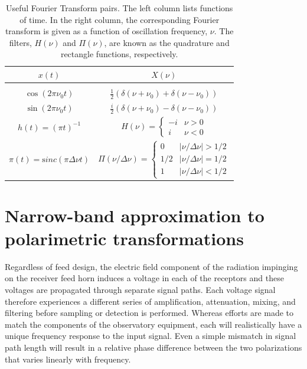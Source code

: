 \documentclass[twocolumn]{aastex6}
\newcommand{\Ci}{\ensuremath{i}}
\newcommand{\sinc}{\mathrm sinc}
\newcommand{\bw}{\ensuremath{ \Delta\nu }}
\begin{document}
\begin{appendix}
\begin{table}
\begin{center}
\begin{tabular}{c|c}
\hline
\hline
$x(t)$ & $X(\nu)$ \\
\hline \\ [-2mm]
$\cos(2\pi\nu_0t)$ & $\frac{1}{2}(\delta(\nu+\nu_0)+\delta(\nu-\nu_0))$ \\ [4mm]
$\sin(2\pi\nu_0t)$ & $\frac{\Ci}{2}(\delta(\nu+\nu_0)-\delta(\nu-\nu_0))$ \\ [4mm]
$h(t)=(\pi t)^{-1}$ & $H(\nu) =\left\{ \begin{array}{cc}
	       	        	-\Ci & \nu > 0 \\
	                	\Ci  & \nu < 0 \end{array} \right.$ \\ [4mm]
$\pi(t)=\sinc(\pi\bw t)$ & $\Pi(\nu/\bw) = \left\{ \begin{array}{cc}
                		0  & |\nu/\bw| > 1/2 \\
				1/2& |\nu/\bw| = 1/2 \\
               			1  & |\nu/\bw| < 1/2 \end{array} \right.$ \\ [8mm]
\hline
\end{tabular}
\end{center}
\caption
{Useful Fourier Transform pairs. The left column lists functions of
time.  In the right column, the corresponding Fourier transform is
given as a function of oscillation frequency, $\nu$. The filters,
$H(\nu)$ and $\Pi(\nu)$, are known as the quadrature and rectangle
functions, respectively.}
\label{tab:fourier}
\end{table}


\section{Narrow-band approximation to polarimetric transformations}
\label{app:linear_transformations}

Regardless of feed design, the electric field component of the
radiation impinging on the receiver feed horn induces a voltage in
each of the receptors and these voltages are propagated through
separate signal paths.
%
Each voltage signal therefore experiences a different series of
amplification, attenuation, mixing, and filtering before sampling or
detection is performed.  Whereas efforts are made to match the
components of the observatory equipment, each will realistically have
a unique frequency response to the input signal.  Even a simple
mismatch in signal path length will result in a relative phase
difference between the two polarizations that varies linearly with
frequency.


\end{appendix}
\end{document}
